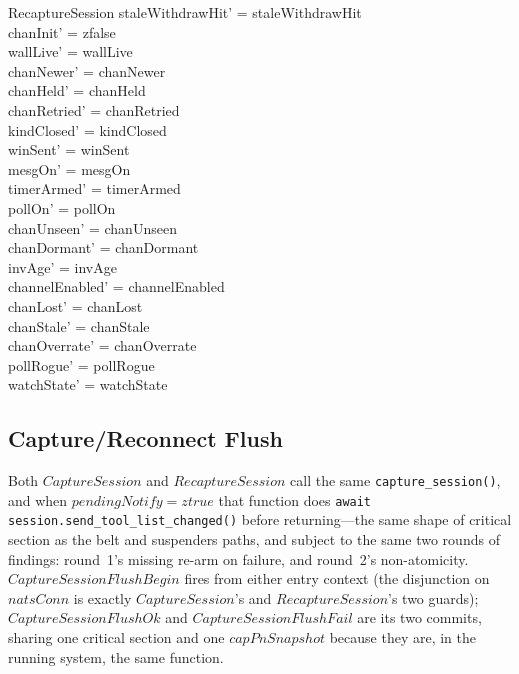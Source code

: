 \documentclass[a4paper,10pt,fleqn]{article}
\begin{document}
\begin{schema}{RecaptureSession}
  staleWithdrawHit' = staleWithdrawHit \\
  chanInit' = zfalse \\
  wallLive' = wallLive \\
  chanNewer' = chanNewer \\
  chanHeld' = chanHeld \\
  chanRetried' = chanRetried \\
  kindClosed' = kindClosed \\
  winSent' = winSent \\
  mesgOn' = mesgOn \\
  timerArmed' = timerArmed \\
  pollOn' = pollOn \\
  chanUnseen' = chanUnseen \\
  chanDormant' = chanDormant \\
  invAge' = invAge \\
  channelEnabled' = channelEnabled \\
  chanLost' = chanLost \\
  chanStale' = chanStale \\
  chanOverrate' = chanOverrate \\
  pollRogue' = pollRogue \\
  watchState' = watchState
\end{schema}

\subsection{Capture/Reconnect Flush}
\label{sec:capflush}

Both $CaptureSession$ and $RecaptureSession$ call the same
\texttt{capture\_session()}, and when $pendingNotify = ztrue$ that
function does \texttt{await session.send\_tool\_list\_changed()}
before returning---the same shape of critical section as the belt and
suspenders paths, and subject to the same two rounds of findings:
round~1's missing re-arm on failure, and round~2's non-atomicity.
$CaptureSessionFlushBegin$ fires from either entry context (the
disjunction on $natsConn$ is exactly $CaptureSession$'s and
$RecaptureSession$'s two guards); $CaptureSessionFlushOk$ and
$CaptureSessionFlushFail$ are its two commits, sharing one critical
section and one $capPnSnapshot$ because they are, in the running
system, the same function.
\end{document}
